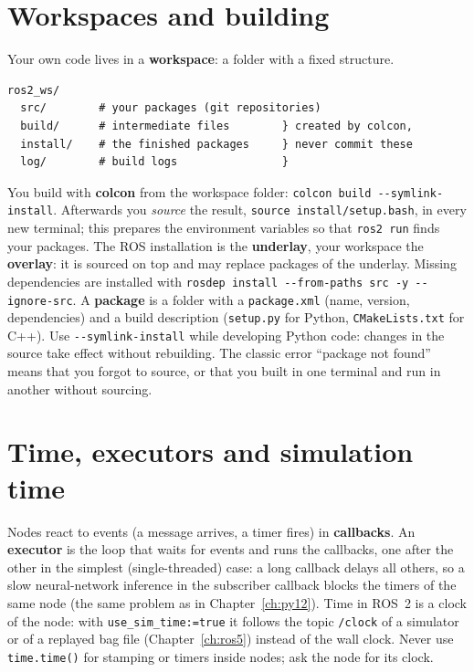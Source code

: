 \section*{Workspaces and building}
Your own code lives in a \textbf{workspace}: a folder with a fixed structure.
\begin{verbatim}
ros2_ws/
  src/        # your packages (git repositories)
  build/      # intermediate files        } created by colcon,
  install/    # the finished packages     } never commit these
  log/        # build logs                }
\end{verbatim}
You build with \textbf{colcon} from the workspace folder: \verb!colcon build --symlink-install!. Afterwards you \emph{source} the result, \verb!source install/setup.bash!, in every new terminal; this prepares the environment variables so that \verb!ros2 run! finds your packages. The ROS installation is the \textbf{underlay}, your workspace the \textbf{overlay}: it is sourced on top and may replace packages of the underlay. Missing dependencies are installed with \verb!rosdep install --from-paths src -y --ignore-src!. A \textbf{package} is a folder with a \verb!package.xml! (name, version, dependencies) and a build description (\verb!setup.py! for Python, \verb!CMakeLists.txt! for C++). Use \verb!--symlink-install! while developing Python code: changes in the source take effect without rebuilding. The classic error ``package not found'' means that you forgot to source, or that you built in one terminal and run in another without sourcing.

\section*{Time, executors and simulation time}
Nodes react to events (a message arrives, a timer fires) in \textbf{callbacks}. An \textbf{executor} is the loop that waits for events and runs the callbacks, one after the other in the simplest (single-threaded) case: a long callback delays all others, so a slow neural-network inference in the subscriber callback blocks the timers of the same node (the same problem as in Chapter~\ref{ch:py12}). Time in ROS~2 is a clock of the node: with \verb!use_sim_time:=true! it follows the topic \verb!/clock! of a simulator or of a replayed bag file (Chapter~\ref{ch:ros5}) instead of the wall clock. Never use \verb!time.time()! for stamping or timers inside nodes; ask the node for its clock.

